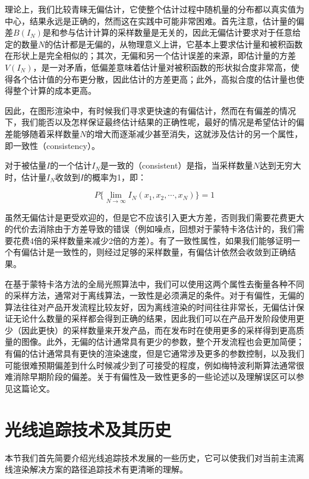 理论上，我们比较青睐无偏估计，它使整个估计过程中随机量的分布都以真实值为中心，结果永远是正确的，然而这在实践中可能非常困难。首先注意，估计量的偏差$B(I_N)$是和参与估计计算的采样数量是无关的，因此无偏估计要求对于任意给定的数量$N$的估计都是无偏的，从物理意义上讲，它基本上要求估计量和被积函数在形状上是完全相似的；其次，无偏和另一个估计误差的来源，即估计量的方差$V(I_N)$，是一对矛盾，低偏差意味着估计量对被积函数的形状拟合度非常高，使得各个估计值的分布更分散，因此估计的方差更高；此外，高拟合度的估计量也使得整个计算的成本更高。

因此，在图形渲染中，有时候我们寻求更快速的有偏估计，然而在有偏差的情况下，我们能否以及怎样保证最终估计结果的正确性呢，最好的情况是希望估计的偏差能够随着采样数量$N$的增大而逐渐减少甚至消失，这就涉及估计的另一个属性，即一致性（consistency）。

对于被估量$I$的一个估计$I_N$是一致的（consistent）是指，当采样数量$N$达到无穷大时，估计量$I_N$收敛到$I$的概率为1，即：

\begin{equation}
	P\{\lim_{N\to \infty}I_N(x_1,x_2,\cdots,x_N)\}=1
\end{equation}

虽然无偏估计是更受欢迎的，但是它不应该引入更大方差，否则我们需要花费更大的代价去消除由于方差导致的错误（例如噪点，回想对于蒙特卡洛估计的，我们需要花费4倍的采样数量来减少2倍的方差）。有了一致性属性，如果我们能够证明一个有偏估计是一致性的，则经过足够的采样数量，有偏估计依然会收敛到正确结果。

在基于蒙特卡洛方法的全局光照算法中，我们可以使用这两个属性去衡量各种不同的采样方法，通常对于离线算法，一致性是必须满足的条件。对于有偏性，无偏的算法往往对产品开发流程比较友好，因为离线渲染的时间往往非常长，无偏估计保证无论什么数量的采样都会得到正确的结果，因此我们可以在产品开发阶段使用更少（因此更快）的采样数量来开发产品，而在发布时在使用更多的采样得到更高质量的图像。此外，无偏的估计通常具有更少的参数，整个开发流程也会更加简便；有偏的估计通常具有更快的渲染速度，但是它通常涉及更多的参数控制，以及我们可能很难预期偏差到什么时候减少到了可接受的程度，例如梅特波利斯算法通常很难消除早期阶段的偏差。关于有偏性及一致性更多的一些论述以及理解误区可以参见\cite{a:FiveCommonMisconceptionsaboutBiasinLightTransportSimulation}这篇论文。



 

\section{光线追踪技术及其历史}\label{sec:pt-history}
本节我们首先简要介绍光线追踪技术发展的一些历史，它可以使我们对当前主流离线渲染解决方案的路径追踪技术有更清晰的理解。

